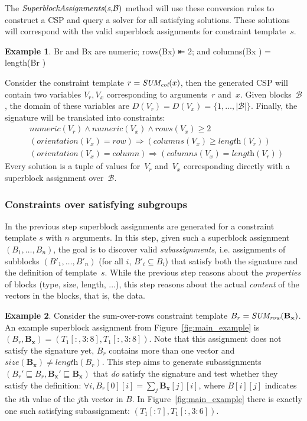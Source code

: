 \documentclass{IEEEtran}
\newcommand{\format}[1]{\textit{#1}\xspace}
\newcommand{\generategroups}{\format{SuperblockAssignments}}
\newcommand{\blocks}{\ensuremath{\mathcal{B}}\xspace}
\newcommand{\range}[3]{\ensuremath{#1[#2,#3]}}
\newcommand{\rangeto}[2]{#1{:}#2}
\newcommand{\rangeall}{:}
\newcommand{\eccalc}[2]{\ensuremath{#1 = #2}}
\newcommand{\ecsumc}[2]{\eccalc{#1}{\textit{SUM\textsubscript{col}}(#2)}}
\newcommand{\ecsumr}[2]{\eccalc{#1}{\textit{SUM\textsubscript{row}}(#2)}}
\newcommand{\numeric}{\format{numeric}}
\newcommand{\plength}{\format{length}}
\newcommand{\psize}{\format{size}}
\newcommand{\por}{\format{orientation}}
\newcommand{\prows}{\format{rows}}
\newcommand{\pcols}{\format{columns}}
\newcommand{\sg}{B}
\theoremstyle{definition}
\newtheorem{example}{Example}
\begin{document}
The $\generategroups(\textit{s,\blocks})$ method will use these conversion rules to construct a CSP and query a solver for all satisfying solutions.
These solutions will correspond with the valid superblock assignments for constraint template~$s$.

\begin{example}
Br and Bx are numeric; rows(Bx) ⇤ 2; and columns(Bx ) = length(Br )

  Consider the constraint template $\ecsumc{r}{x}$, then the generated CSP will contain two variables $V_r, V_x$ corresponding to arguments~$r$ and~$x$.
  Given blocks~\blocks, the domain of these variables are $D(V_r) = D(V_x) = \{ 1, \dots, |\blocks| \}$.
  Finally, the signature will be translated into constraints:
  \begin{align*}
    & \numeric(V_r) \land \numeric(V_x) \land \prows(V_x) \geq 2 \\
    & (\por(V_x) = \mathit{row}) \Rightarrow (\pcols(V_x) \geq \plength(V_r)) \\
    & (\por(V_x) = \mathit{column}) \Rightarrow (\pcols(V_x) = \plength(V_r))
  \end{align*}
  Every solution is a tuple of values for~$V_r$ and~$V_x$ corresponding directly with a superblock assignment over~\blocks.
\end{example}





\subsubsection{Constraints over satisfying subgroups}
\label{sec:algo:subgr}
In the previous step superblock assignments are generated for a constraint template $s$ with $n$ arguments.
In this step, given such a superblock assignment $(B_1, \dots, B_n)$, the goal is to discover valid \textit{subassignments}, i.e. assignments of subblocks $(B'_1, \dots, B'_n)$ (for all $i$, $B'_i \subseteq B_i$) that satisfy both the signature and the definition of template~$s$.
While the previous step reasons about the \textit{properties} of blocks (type, size, length, ...), this step reasons about the actual \textit{content} of the vectors in the blocks, that is, the data.

\begin{example}
  Consider the sum-over-rows constraint template $\ecsumr{\sg_r}{\mathbf{\sg_x}}$.
  An example superblock assignment from Figure~\ref{fig:main_example} is $(B_r, \mathbf{\sg_x}) = (\range{T_1}{\rangeall}{\rangeto{3}{8}}, \range{T_1}{\rangeall}{\rangeto{3}{8}})$.
  Note that this assignment does not satisfy the signature yet, $\sg_r$ contains more than one vector and $\psize(\mathbf{\sg_x}) \neq \plength(B_r)$.
  This step aims to generate subassignments $(B_r' \sqsubseteq B_r, \mathbf{B_x}' \sqsubseteq \mathbf{B_x})$ that \textit{do} satisfy the signature and test whether they satisfy the definition: $\forall i, \sg_r[0][i] = \sum_j \mathbf{\sg_x}[j][i]$, where $B[i][j]$ indicates the $i$th value of the $j$th vector in $B$.
  In Figure~\ref{fig:main_example} there is exactly one such satisfying subassignment: $(T_1[:7], T_1[:,3:6])$.
\end{example}
\end{document}
